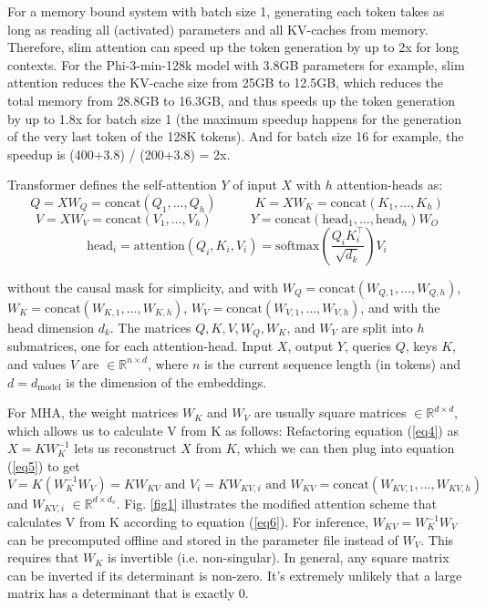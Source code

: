 \documentclass{article}
\newcommand{\eR}[2]{$\in \mathbb{R}^{#1 \times #2}$} %
\begin{document}
For a memory bound system with batch size 1, generating each token takes as long as reading all (activated) parameters and all KV-caches from memory. Therefore, slim attention can speed up the token generation by up to 2x for long contexts. For the Phi-3-min-128k model with 3.8GB parameters for example, slim attention reduces the KV-cache size from 25GB to 12.5GB, which reduces the total memory from 28.8GB to 16.3GB, and thus speeds up the token generation by up to 1.8x for batch size 1 (the maximum speedup happens for the generation of the very last token of the 128K tokens). And for batch size 16 for example, the speedup is (400+3.8) / (200+3.8) = 2x.

Transformer \citep{vanilla} defines the self-attention $Y$ of input $X$ with $h$ attention-heads as:
\begin{equation}
  Q = X W_Q = \text{concat} \left( Q_1, \ldots, Q_h \right) \qquad \quad K = X W_K = \text{concat} \left( K_1, \ldots, K_h \right) \label{eq4}
\end{equation}
\begin{equation}
  V = X W_V = \text{concat} \left( V_1, \ldots, V_h \right) \qquad \quad Y = \text{concat} \left( \text{head}_1, \ldots, \text{head}_h \right) W_O  \label{eq5}
\end{equation}
\begin{equation}
  \text{head}_i = \text{attention} \left( Q_i, K_i, V_i \right) = \text{softmax} \left( \frac{Q_i K_i^\top}{\sqrt{d_k}} \right) V_i \label{eq2}
\end{equation}

without the causal mask for simplicity, and with $W_Q = \text{concat}(W_{Q,1}, \ldots, W_{Q,h})$, $W_K = \text{concat}(W_{K,1}, \ldots, W_{K,h})$, $W_V = \text{concat}(W_{V,1}, \ldots, W_{V,h})$, and with the head dimension $d_k$. The matrices $Q, K, V, W_Q, W_K$, and $W_V$ are split into $h$ submatrices, one for each attention-head. Input $X$, output $Y$, queries $Q$, keys $K$, and values $V$ are \eR{n}{d}, where $n$ is the current sequence length (in tokens) and $d = d_{\text{model}}$ is the dimension of the embeddings.

For MHA, the weight matrices $W_K$ and $W_V$ are usually square matrices \eR{d}{d}, which allows us to calculate V from K as follows: Refactoring equation (\ref{eq4}) as $X = K W_K^{-1}$ lets us reconstruct $X$ from $K$, which we can then plug into equation (\ref{eq5}) to get
\begin{equation}
  V = K (W_K^{-1} W_V) = K W_{KV} \text{ and } V_i = K W_{KV,i} \text{ and } W_{KV} = \text{concat}(W_{KV,1}, \ldots, W_{KV,h})
\label{eq6} \end{equation}
and $W_{KV,i}$ \eR{d}{d_v}. Fig. \ref{fig1} illustrates the modified attention scheme that calculates V from K according to equation (\ref{eq6}). For inference, $W_{KV} = W_K^{-1} W_V$ can be precomputed offline and stored in the parameter file instead of $W_V$. This requires that $W_K$ is invertible (i.e. non-singular). In general, any square matrix can be inverted if its determinant is non-zero. It’s extremely unlikely that a large matrix has a determinant that is exactly 0.
\end{document}
